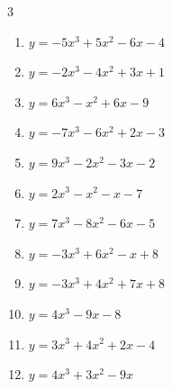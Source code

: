 \begin{multicols}{3}
\begin{enumerate}
  \item $y=-5x^{3}+5x^{2}-6x-4$


  \item $y=-2x^{3}-4x^{2}+3x+1$


  \item $y=6x^{3}-x^{2}+6x-9$


  \item $y=-7x^{3}-6x^{2}+2x-3$


\columnbreak %

\resetques

  \item $y=9x^{3}-2x^{2}-3x-2$


  \item $y=2x^{3}-x^{2}-x-7$


  \item $y=7x^{3}-8x^{2}-6x-5$


  \item $y=-3x^{3}+6x^{2}-x+8$


  \item $y=-3x^{3}+4x^{2}+7x+8$


  \item $y=4x^{3}-9x-8$


  \item $y=3x^{3}+4x^{2}+2x-4$


  \item $y=4x^{3}+3x^{2}-9x$



\end{enumerate}
\end{multicols}
